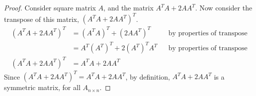 \documentclass{article}
\begin{document}
\begin{proof}
  Consider square matrix $A$, and the matrix $A^TA + 2AA^T$. Now consider the transpose of this matrix, $(A^TA + 2AA^T)^T$.
  \begin{align*}
    (A^TA + 2AA^T)^T & = (A^TA)^T + (2AA^T)^T     &  & \text{by properties of transpose} \\
                     & = A^T(A^T)^T + 2(A^T)^TA^T &  & \text{by properties of transpose} \\
    (A^TA + 2AA^T)^T & = A^TA + 2AA^T
  \end{align*}
  Since $(A^TA + 2AA^T)^T = A^TA + 2AA^T$, by definition, $A^TA + 2AA^T$ is a symmetric matrix, for all $A_{n \times n}$.
\end{proof}
\qdash
\end{document}
